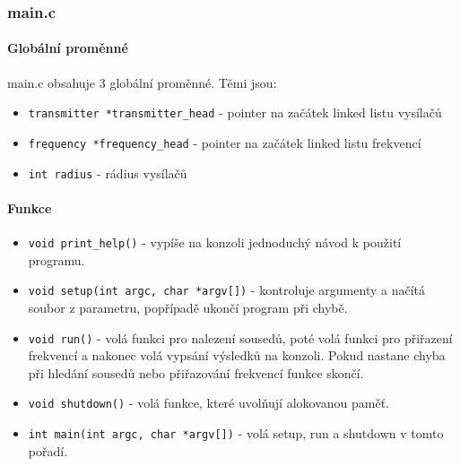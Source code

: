 \documentclass[12pt]{article}
\begin{document}
\subsubsection{main.c}
\paragraph{Globální proměnné}
main.c obsahuje 3 globální proměnné. Těmi jsou:
\begin{itemize}
	\item \texttt{transmitter *transmitter\_head} - pointer na začátek linked
		listu vysílačů
	\item \texttt{frequency *frequency\_head} - pointer na začátek linked
		listu frekvencí
	\item \texttt{int radius} - rádius vysílačů
\end{itemize}
\paragraph{Funkce}
\begin{itemize}
	\item \texttt{void print\_help()} - vypíše na konzoli jednoduchý
		návod k použití programu.
	\item \texttt{void setup(int argc, char *argv[])} - kontroluje
		argumenty a načítá soubor z parametru, popřípadě ukončí
		program při chybě.
	\item \texttt{void run()} - volá funkci pro nalezení sousedů, poté volá
		funkci pro přiřazení frekvencí a nakonec volá vypsání výsledků
		na konzoli. Pokud nastane chyba při hledání sousedů nebo 
		přiřazování frekvencí funkce skončí.
	\item \texttt{void shutdown()} - volá funkce, které uvolňují alokovanou
		paměť.
	\item \texttt{int main(int argc, char *argv[])} - volá setup, run a 
		shutdown v tomto pořadí.
\end{itemize}
%
\end{document}
